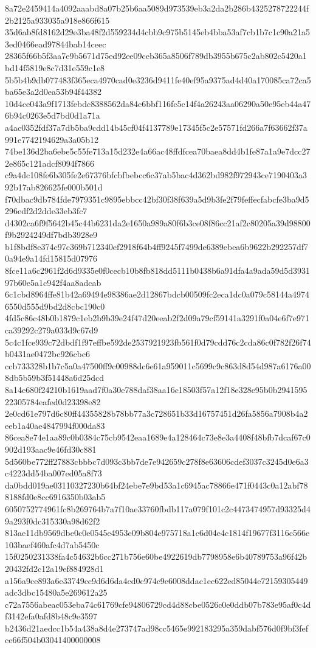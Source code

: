 {8a72e2459414a4092aaabd8a07b25b6aa5089d973539eb3a2da2b286b4325278722244f2b2125a933035a918e866f615
35d6ab8fd8162d29e3ba48f2d559234d4cbb9c975b5145eb4bba53af7cb1b7c1c90a21a53ed0466ead97844bab14ceec
28365f66b5f3aa7e9b5671d75ed92ee09ceb365a8506f789db3955b675c2ab802c5420a1bd14f5819e8c7d31e559c1e8
5b5b4b9db077483f365eca4970cad0e3236d9411fe40ef95a9375ad4d40a170085ca72ca5ba65e3a2d0ea53b94f44382
10d4ce043a9f1713febdc8388562da84c6bbf116fc5c14f4a26243aa06290a50e95eb44a476b94c0263e5d7bd0d1a71a
a4ac0352fdf37a7db5ba9cdd14b45cf04f4137789e17345f5c2e57571fd266a7f63662f37a991e7742194629a3a05b12
74be136d2ba6ebe5c55fe713a15d232e4a66ac48ffdfcea70baea8dd4b1fe87a1a9e7dcc272e865c121adcf8094f7866
c9a4dc108fe6b305fe2e67376bfcbfbebcc6c37ab5bac4d362bd982f972943ce7190403a392b17ab826625fe000b501d
f70dbac9db784fde7979351c9895ebbcc42bf30f38f639a5d9b3fe2f79feffecfabcfe3ba9d5296edf2d2dde33eb3fc7
d4302ca6f9f5642b45c44b6231da2e1650a989a80f6b3ce08f86cc21af2c80205a39d98800f9b2924249df7bdb3928e9
b1f8bdf8e374c97c369b712340ef2918f64b4ff9245f7499de6389ebea6b9622b292257df70a94e9a14fd15815d07976
8fce11a6c2961f2d6d9335e0f0cecb10b8fb818dd5111b0438b6a91dfa4a9ada59d5d393197b60e5a1c942f4aa8adcab
6c1cbd8964ffe81b42a69494e98386ae2d12867bdcb00509fc2eca1dc0a079c58144a49746550d555d9bd2d8cbc190c0
4fd5c86c48b0b1879c1eb2b9b39e24f47d20eeab2f2d09a79cf59141a3291f0a04e6f7e971ca39292c279a033d9c67d9
5c4c1fce939c72dbdf1f97effbe592de2537921923fb561f0d79cdd76c2cda86c0f782f26f74b0431ae0472bc926cbc6
ccb733328b1b7c5a0a47500ff9c00988dc6e61a959011c5699c9c863d8d54d987a6176a008db5b59b3f51448a6d25dcd
8a14e680f24210b1619aad7f0a30e788daf38aa16c18503f57a12f18e328e95b0b294159522305784eafed0d23398e82
2e0cd61e797d6c80ff44355828b78bb77a3c728651b33d16757451d26fa5856a7908b4a2eeb1a40ae4847994f000da83
86cea8e74e1aa89c0b0384c75cb9542eaa1689e4a128464c73e8e3a4408f48bfb7dcaf67c0902d193aac9e46fd30c881
5d560be772ff27883cbbbc7d093c3bb7de7e942659c278f8e63606cdef3037c3245d0e6a3c4223dd54ba007ed05a8f73
da0bdd019ae03110327230b64bf24ebe7e9bd53a1c6945ac78866e471f0443c0a12abf788188fd0e8cc6916350b03ab5
6050752774961fc8b269764b7a7f10ae33760fbdb117a079f101c2c4473474957d93325d49a293f0dc315330a98d62f2
813ae11db9569dbe0c0e0545e4953e09b804e975718a1c6d04e4c1814f19677f3116c566e103baef460afc4d7ab5450c
15f0250231338fa4c54632b6cc271b756e60be4922619db7798958e6b40789753a96f42b20432fd2c12a19ef884928d1
a156a9ce893a6e33749cc9d6d6da4cd0c974c9e6008ddac1ec622ed85044e72159305449adc3dbc15480a5e269612a25
c72a7556abeac053eba74c61769cfe94806729cd4d88cbe0526c0e0ddb07b783e95af0c4df3142efa0afd8b48c9e3597
b2436d21aedcc1b54a438a8d4e273747ad98cc5465e992183295a359dabf576d0f9bf3fefce66f504b03041400000008
}
